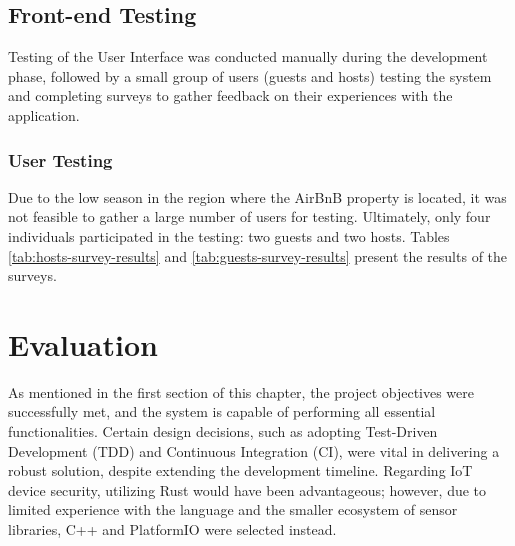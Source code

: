 \subsection{Front-end Testing}

Testing of the User Interface was conducted manually during the development phase, followed by a small group of users 
(guests and hosts) testing the system and completing surveys to gather feedback on their experiences with the 
application.

\subsubsection{User Testing}

Due to the low season in the region where the AirBnB property is located, it was not feasible to gather a large number 
of users for testing. Ultimately, only four individuals participated in the testing: two guests and two hosts. Tables 
\ref{tab:hosts-survey-results} and \ref{tab:guests-survey-results} present the results of the surveys.

\section{Evaluation}




As mentioned in the first section of this chapter, the project objectives were successfully met, and the system is 
capable of performing all essential functionalities. Certain design decisions, such as adopting Test-Driven Development 
(TDD) and Continuous Integration (CI), were vital in delivering a robust solution, despite extending the development 
timeline. Regarding IoT device security, utilizing Rust \cite{Rust2024} would have been advantageous; however, due to 
limited experience with the language and the smaller ecosystem of sensor libraries, C++ and PlatformIO were selected 
instead.

